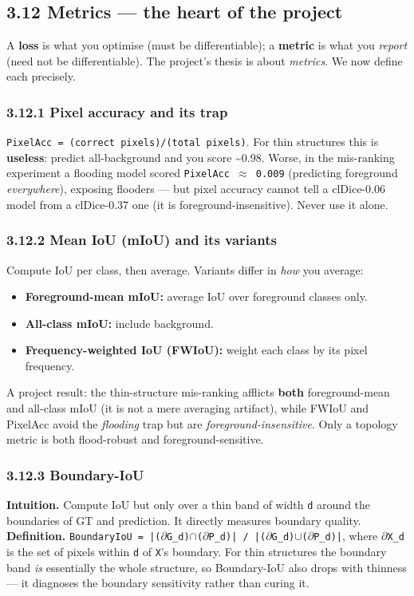 \documentclass[11pt]{article}
\begin{document}
\subsection*{3.12 Metrics --- the heart of the project}

A \textbf{loss} is what you optimise (must be differentiable); a \textbf{metric} is what you \textit{report} (need not be differentiable). The project's thesis is about \textit{metrics}. We now define each precisely.

\subsubsection*{3.12.1 Pixel accuracy and its trap}
\texttt{PixelAcc = (correct pixels)/(total pixels)}. For thin structures this is \textbf{useless}: predict all-background and you score \textasciitilde{}0.98. Worse, in the mis-ranking experiment a flooding model scored \texttt{PixelAcc $\approx$ 0.009} (predicting foreground \textit{everywhere}), exposing flooders --- but pixel accuracy cannot tell a clDice-0.06 model from a clDice-0.37 one (it is foreground-insensitive). Never use it alone.

\subsubsection*{3.12.2 Mean IoU (mIoU) and its variants}
Compute IoU per class, then average. Variants differ in \textit{how} you average:
\begin{itemize}\setlength{\itemsep}{1pt}
\item \textbf{Foreground-mean mIoU:} average IoU over foreground classes only.
\item \textbf{All-class mIoU:} include background.
\item \textbf{Frequency-weighted IoU (FWIoU):} weight each class by its pixel frequency.
\end{itemize}

A project result: the thin-structure mis-ranking afflicts \textbf{both} foreground-mean and all-class mIoU (it is not a mere averaging artifact), while FWIoU and PixelAcc avoid the \textit{flooding} trap but are \textit{foreground-insensitive}. Only a topology metric is both flood-robust and foreground-sensitive.

\subsubsection*{3.12.3 Boundary-IoU}
\textbf{Intuition.} Compute IoU but only over a thin band of width \texttt{d} around the boundaries of GT and prediction. It directly measures boundary quality. \textbf{Definition.} \texttt{BoundaryIoU = |($\partial$G\_d)$\cap$($\partial$P\_d)| / |($\partial$G\_d)$\cup$($\partial$P\_d)|}, where \texttt{$\partial$X\_d} is the set of pixels within \texttt{d} of \texttt{X}'s boundary. For thin structures the boundary band \textit{is} essentially the whole structure, so Boundary-IoU also drops with thinness --- it diagnoses the boundary sensitivity rather than curing it.
\end{document}
